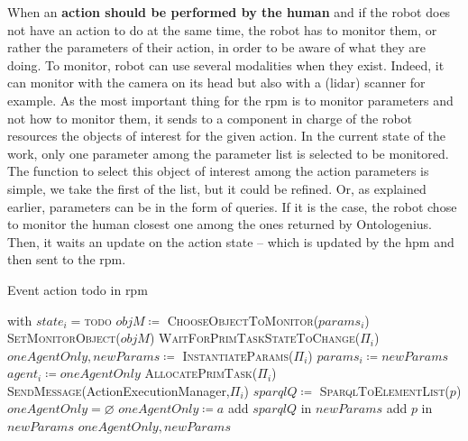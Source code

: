 \documentclass[a4paper,11pt,twoside]{StyleThese}
\begin{document}
When an \textbf{action should be performed by the human} and if the robot does not have an action to do at the same time, the robot has to monitor them, or rather the parameters of their action, in order to be aware of what they are doing. To monitor, robot can use several modalities when they exist. Indeed, it can monitor with the camera on its head but also with a (lidar) scanner for example. As the most important thing for the \acrshort{rpm} is to monitor parameters and not how to monitor them, it sends to a component in charge of the robot resources the objects of interest for the given action. In the current state of the work, only one parameter among the parameter list is selected to be monitored. The function to select this object of interest among the action parameters is simple, we take the first of the list, but it could be refined. Or, as explained earlier, parameters can be in the form of \sparql{} queries. If it is the case, the robot chose to monitor the human closest one among the ones returned by Ontologenius. Then, it waits an update on the action state -- which is updated by the \acrfull{hpm} and then sent to the \acrshort{rpm}.


\begin{algorithm}[!htb]
	\caption{Event action todo in \acrshort{rpm}}
	\label{chap6:algo:todo}
	\begin{algorithmic}
	 with $state_i=$\textsc{todo}
	\State $objM \coloneqq$ \textsc{ChooseObjectToMonitor($params_i$)}
	\State \textsc{SetMonitorObject($objM$)}
	\State \textsc{WaitForPrimTaskStateToChange($\Pi_i$)}
		\State $oneAgentOnly,newParams\coloneqq$ \textsc{InstantiateParams}($\Pi_i$)
		\State $params_i \coloneqq newParams$
		\EndIf
			\State $agent_i \coloneqq oneAgentOnly$ 
		\Else
			\State \textsc{AllocatePrimTask}($\Pi_i$)
			 \State \textsc{SendMessage}(ActionExecutionManager,$\Pi_i$)
			 \EndIf
		\EndIf
	\EndIf
	\EndFunction
	\Statex
		\State $sparqlQ \coloneqq$ \textsc{SparqlToElementList($p$)} 
		\State $oneAgentOnly = \varnothing$
			\State $oneAgentOnly \coloneqq a$
		\EndIf
		\State add $sparqlQ$ in $newParams$
	\Else
		\State add $p$ in $newParams$
	\EndIf
	\EndFor
	\State \Return $oneAgentOnly,newParams$
	\EndFunction
\end{algorithmic}
\end{algorithm}
\end{document}
